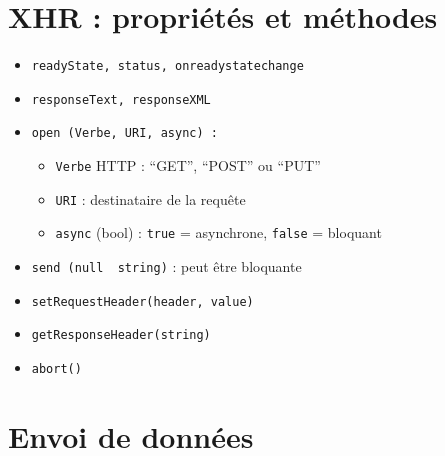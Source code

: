 \hypertarget{xhr-propriuxe9tuxe9s-et-muxe9thodes}{%
\section{XHR : propriétés et
méthodes}\label{xhr-propriuxe9tuxe9s-et-muxe9thodes}}

\begin{itemize}
\tightlist
\item
  \textenglish{\texttt{readyState,\ status,\ onreadystatechange}}
\item
  \textenglish{\texttt{responseText,\ responseXML}}
\item
  \textenglish{\texttt{open\ (Verbe,\ URI,\ async)\ :}}

  \begin{itemize}
  \tightlist
  \item
    \textenglish{\texttt{Verbe}} HTTP : ``GET'', ``POST'' ou ``PUT''
  \item
    \textenglish{\texttt{URI}} : destinataire de la requête
  \item
    \textenglish{\texttt{async}} (bool) : \textenglish{\texttt{true}} =
    asynchrone, \textenglish{\texttt{false}} = bloquant
  \end{itemize}
\item
  \textenglish{\texttt{send\ (null\ \textbar{}\ string)}} : peut être
  bloquante
\item
  \textenglish{\texttt{setRequestHeader(header,\ value)}}
\item
  \textenglish{\texttt{getResponseHeader(string)}}
\item
  \textenglish{\texttt{abort()}}
\end{itemize}

\hypertarget{envoi-de-donnuxe9es}{%
\section{Envoi de données}\label{envoi-de-donnuxe9es}}

